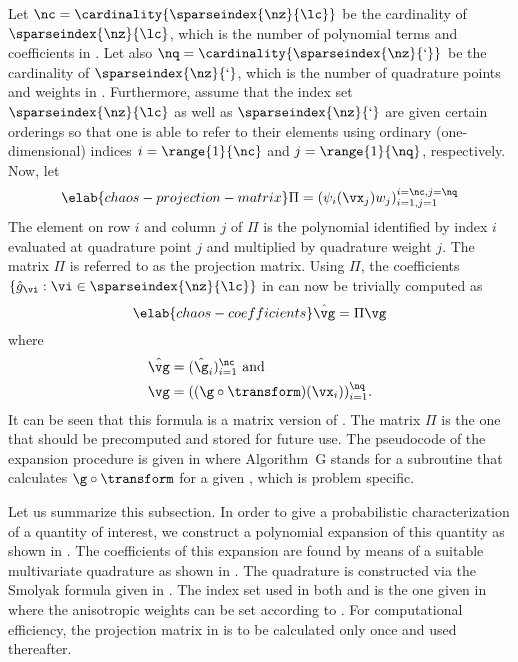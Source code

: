 Let $\nc = \cardinality{\sparseindex{\nz}{\lc}}$ be the cardinality of
$\sparseindex{\nz}{\lc}$, which is the number of polynomial terms and
coefficients in . Let also $\nq =
\cardinality{\sparseindex{\nz}{\lq}}$ be the cardinality of
$\sparseindex{\nz}{\lq}$, which is the number of quadrature points and weights
in . Furthermore, assume that the index set
$\sparseindex{\nz}{\lc}$ as well as $\sparseindex{\nz}{\lq}$ are given certain
orderings so that one is able to refer to their elements using ordinary
(one-dimensional) indices $i = \range{1}{\nc}$ and $j = \range{1}{\nq}$,
respectively. Now, let
\begin{equation} \elab{chaos-projection-matrix}
  \Pi = (\psi_i(\vx_j) w_j)_{i = 1, j = 1}^{i = \nc, j = \nq}
\end{equation}
The element on row $i$ and column $j$ of $\Pi$ is the polynomial identified by
index $i$ evaluated at quadrature point $j$ and multiplied by quadrature weight
$j$. The matrix $\Pi$ is referred to as the projection matrix. Using $\Pi$, the
coefficients $\{ \hat{g}_{\vi}: \vi \in \sparseindex{\nz}{\lc} \}$ in
 can now be trivially computed as
\begin{equation} \elab{chaos-coefficients}
  \hat{\vg} = \Pi \vg
\end{equation}
where
\begin{align*}
  & \hat{\vg} = (\hat{\g}_i)_{i = 1}^\nc \text{ and} \\
  & \vg = ((\g \circ \transform)(\vx_i))_{i = 1}^\nq.
\end{align*}
It can be seen that this formula is a matrix version of
. The matrix $\Pi$ is the one that should be precomputed
and stored for future use. The pseudocode of the expansion procedure is given in
 where Algorithm~G stands for a subroutine that
calculates $\g \circ \transform$ for a given \vz, which is problem specific.

Let us summarize this subsection. In order to give a probabilistic
characterization of a quantity of interest, we construct a polynomial expansion
of this quantity as shown in . The coefficients of this
expansion are found by means of a suitable multivariate quadrature as shown in
. The quadrature is constructed via the Smolyak formula
given in . The index set used in both
 and  is the one given in
 where the anisotropic weights can be set
according to . For computational efficiency, the
projection matrix in  is to be calculated only
once and used thereafter.


